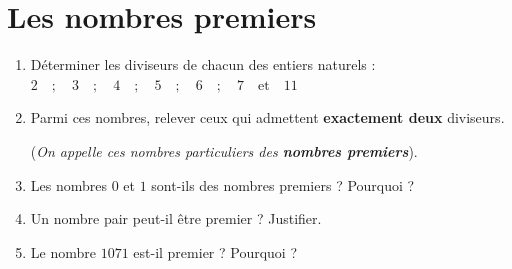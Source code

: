 \documentclass[10pt, a4paper]{article}
\begin{document}
\section{Les nombres premiers }

\begin{Activite}[][10 min]
\begin{enumerate}[leftmargin=*,itemsep=0.5pt]
    \item Déterminer les diviseurs de chacun des entiers naturels : 
    $2 \quad ; \quad 3 \quad ; \quad 4 \quad ; \quad 5 \quad ; \quad 6 \quad ; \quad 7 \quad \text{et} \quad 11$
    
    \item Parmi ces nombres, relever ceux qui admettent \textbf{exactement deux} diviseurs.
    
    (\textit{On appelle ces nombres particuliers des \textbf{nombres premiers}}).
    
    \item Les nombres $0$ et $1$ sont-ils des nombres premiers ? Pourquoi ?
    
    \item Un nombre pair peut-il être premier ? Justifier.
    
    \item Le nombre $1071$ est-il premier ? Pourquoi ?
\end{enumerate}
\end{Activite}
\end{document}
